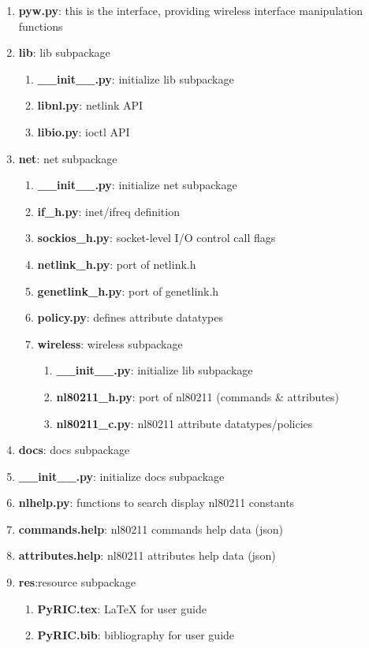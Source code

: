 \documentclass[11pt]{article}
\begin{document}
\begin{enumerate}
\begin{enumerate}
\item \textbf{pyw.py}: this is the interface, providing wireless interface manipulation functions
\item \textbf{lib}: lib subpackage
\begin{enumerate}
\item \textbf{\_\_init\_\_.py}: initialize lib subpackage
\item \textbf{libnl.py}: netlink API
\item \textbf{libio.py}: ioctl API
\end{enumerate}
\item \textbf{net}: net subpackage
\begin{enumerate}
\item \textbf{\_\_init\_\_.py}: initialize net subpackage
\item \textbf{if\_h.py}: inet/ifreq definition
\item \textbf{sockios\_h.py}: socket-level I/O control call flags
\item \textbf{netlink\_h.py}: port of netlink.h
\item \textbf{genetlink\_h.py}: port of genetlink.h
\item \textbf{policy.py}: defines attribute datatypes
\item \textbf{wireless}: wireless subpackage
\begin{enumerate}
\item \textbf{\_\_init\_\_.py}: initialize lib subpackage
\item \textbf{nl80211\_h.py}: port of nl80211 (commands \& attributes)
\item \textbf{nl80211\_c.py}: nl80211 attribute datatypes/policies
\end{enumerate}
\end{enumerate}
\item \textbf{docs}: docs subpackage
\item \textbf{\_\_init\_\_.py}: initialize docs subpackage
\item \textbf{nlhelp.py}: functions to search display nl80211 constants
\item \textbf{commands.help}: nl80211 commands help data (json)
\item \textbf{attributes.help}: nl80211 attributes help data (json)
\item \textbf{res}:resource subpackage
\begin{enumerate}
\item \textbf{PyRIC.tex}: LaTeX for user guide
\item \textbf{PyRIC.bib}: bibliography for user guide
\end{enumerate}
\end{enumerate}
\end{enumerate}
\end{document}
